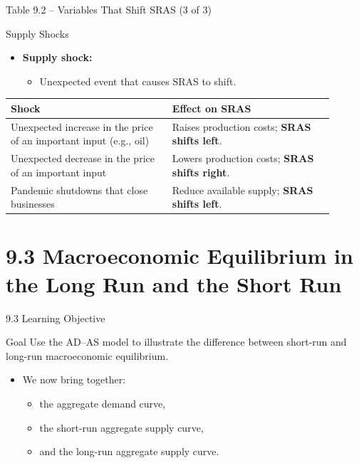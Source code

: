 \documentclass[aspectratio=169]{beamer}
\begin{document}
\begin{frame}{Table 9.2 -- Variables That Shift SRAS (3 of 3)}
\transfade
\begin{block}{Supply Shocks}
\end{block}
\begin{itemize}[<+->]
  \item \textbf{Supply shock:}
  \begin{itemize}[<+->]
    \item Unexpected event that causes SRAS to shift.
  \end{itemize}
\end{itemize}
\begin{table}[h]
\centering
\begin{tabular}{p{0.45\linewidth} p{0.45\linewidth}}
\toprule
\textbf{Shock} & \textbf{Effect on SRAS} \\
\midrule
Unexpected increase in the price of an important input (e.g., oil) & Raises production costs; \textbf{SRAS shifts left}. \\
Unexpected decrease in the price of an important input & Lowers production costs; \textbf{SRAS shifts right}. \\
Pandemic shutdowns that close businesses & Reduce available supply; \textbf{SRAS shifts left}. \\
\bottomrule
\end{tabular}
\end{table}
\end{frame}

\section{9.3 Macroeconomic Equilibrium in the Long Run and the Short Run}

\begin{frame}{9.3 Learning Objective}
\transfade
\begin{block}{Goal}
Use the AD--AS model to illustrate the difference between short-run and long-run macroeconomic equilibrium.
\end{block}
\begin{itemize}[<+->]
  \item We now bring together:
  \begin{itemize}[<+->]
    \item the aggregate demand curve,
    \item the short-run aggregate supply curve,
    \item and the long-run aggregate supply curve.
  \end{itemize}
\end{itemize}
\end{frame}
\end{document}
